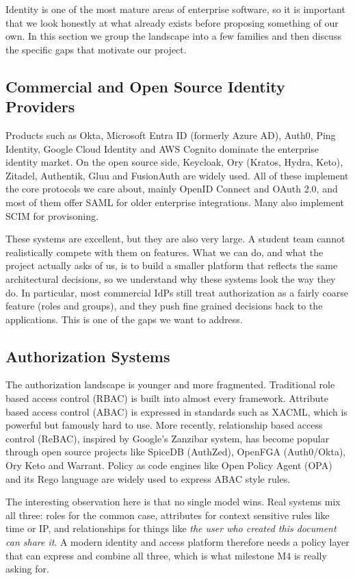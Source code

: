 \documentclass[11pt,a4paper]{article}
\begin{document}
Identity is one of the most mature areas of enterprise software, so it is important that we look honestly at what already exists before proposing something of our own. In this section we group the landscape into a few families and then discuss the specific gaps that motivate our project.

\subsection{Commercial and Open Source Identity Providers}

Products such as Okta, Microsoft Entra ID (formerly Azure AD), Auth0, Ping Identity, Google Cloud Identity and AWS Cognito dominate the enterprise identity market. On the open source side, Keycloak, Ory (Kratos, Hydra, Keto), Zitadel, Authentik, Gluu and FusionAuth are widely used. All of these implement the core protocols we care about, mainly OpenID Connect and OAuth 2.0, and most of them offer SAML for older enterprise integrations. Many also implement SCIM for provisoning.

These systems are excellent, but they are also very large. A student team cannot realistically compete with them on features. What we can do, and what the project actually asks of us, is to build a smaller platform that reflects the same architectural decisions, so we understand why these systems look the way they do. In particular, most commercial IdPs still treat authorization as a fairly coarse feature (roles and groups), and they push fine grained decisions back to the applications. This is one of the gaps we want to address.

\subsection{Authorization Systems}

The authorization landscape is younger and more fragmented. Traditional role based access control (RBAC) is built into almost every framework. Attribute based access control (ABAC) is expressed in standards such as XACML, which is powerful but famously hard to use. More recently, relationship based access control (ReBAC), inspired by Google's Zanzibar system, has become popular through open source projects like SpiceDB (AuthZed), OpenFGA (Auth0/Okta), Ory Keto and Warrant. Policy as code engines like Open Policy Agent (OPA) and its Rego language are widely used to express ABAC style rules.

The interesting observation here is that no single model wins. Real systems mix all three: roles for the common case, attributes for context sensitive rules like time or IP, and relationships for things like \textit{the user who created this document can share it}. A modern identity and access platform therefore needs a policy layer that can express and combine all three, which is what milestone M4 is really asking for.
\end{document}
